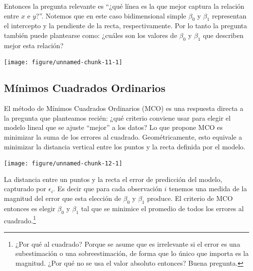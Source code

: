 \documentclass{article}\usepackage[]{graphicx}\usepackage[]{color}
\newenvironment{knitrout}{}{} %
\begin{document}
Entonces la pregunta relevante es ``¿qué línea es la que mejor captura la relación entre $x$ e $y$?''.
Notemos que en este caso bidimensional simple $\beta_0$ y $\beta_1$ representan el intercepto y la pendiente de la recta, respectivamente.
Por lo tanto la pregunta también puede plantearse como: ¿cuáles son los valores de $\beta_0$ y $\beta_1$ que describen mejor esta relación?


\begin{knitrout}
\color{fgcolor}

{\centering \texttt{[image: figure/unnamed-chunk-11-1]} 

}



\end{knitrout}

\subsection{Mínimos Cuadrados Ordinarios}

El método de Mínimos Cuadrados Ordinarios (MCO) es una respuesta directa a la pregunta que planteamos recién: ¿qué criterio conviene usar para elegir el modelo lineal que se ajuste ``mejor'' a los datos?
Lo que propone MCO es minimizar la suma de los errores al cuadrado.
Geométricamente, esto equivale a minimizar la distancia vertical entre los puntos y la recta definida por el modelo.

\begin{knitrout}
\color{fgcolor}

{\centering \texttt{[image: figure/unnamed-chunk-12-1]} 

}



\end{knitrout}

La distancia entre un puntos y la recta el error de predicción del modelo, capturado por $\epsilon_i$. Es decir que para cada observación $i$ tenemos una medida de la magnitud del error que esta elección de $\beta_0$ y $\beta_1$ produce. El criterio de MCO entonces es elegir $\beta_0$ y $\beta_1$ tal que se minimice el promedio de todos los errores al cuadrado.\footnote{¿Por qué al cuadrado? Porque se asume que es irrelevante si el error es una subestimación o una sobreestimación, de forma que lo único que importa es la magnitud. ¿Por qué no se usa el valor absoluto entonces? Buena pregunta.}
\end{document}
